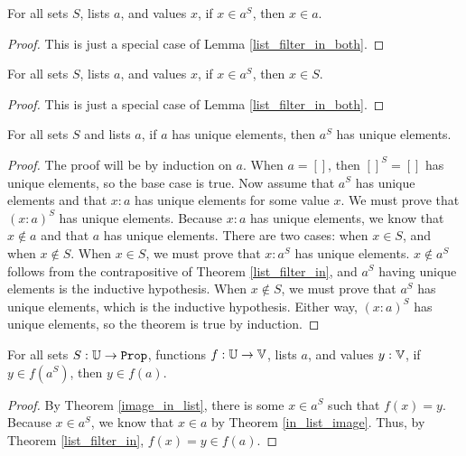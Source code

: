 \documentclass[../math.tex]{subfiles}
\begin{document}
\begin{theorem} \label{list_filter_in}
    For all sets $S$, lists $a$, and values $x$, if $x \in a^S$, then $x \in a$.
\end{theorem}
\begin{proof}
    This is just a special case of Lemma \ref{list_filter_in_both}.
\end{proof}

\begin{theorem} \label{list_filter_in_set}
    For all sets $S$, lists $a$, and values $x$, if $x \in a^S$, then $x \in S$.
\end{theorem}
\begin{proof}
    This is just a special case of Lemma \ref{list_filter_in_both}.
\end{proof}

\begin{theorem} \label{list_filter_unique}
    For all sets $S$ and lists $a$, if $a$ has unique elements, then $a^S$ has
    unique elements.
\end{theorem}
\begin{proof}
    The proof will be by induction on $a$.  When $a = []$, then $[]^S = []$ has
    unique elements, so the base case is true.  Now assume that $a^S$ has unique
    elements and that $x : a$ has unique elements for some value $x$.  We must
    prove that $(x : a)^S$ has unique elements.  Because $x : a$ has unique
    elements, we know that $x \notin a$ and that $a$ has unique elements.  There
    are two cases: when $x \in S$, and when $x \notin S$.  When $x \in S$, we
    must prove that $x : a^S$ has unique elements.  $x \notin a^S$ follows from
    the contrapositive of Theorem \ref{list_filter_in}, and $a^S$ having unique
    elements is the inductive hypothesis.  When $x \notin S$, we must prove that
    $a^S$ has unique elements, which is the inductive hypothesis.  Either way,
    $(x : a)^S$ has unique elements, so the theorem is true by induction.
\end{proof}

\begin{theorem} \label{list_filter_image_in}
    For all sets $S : \set{\U}$, functions $f : \mathbb{U} \to \mathbb{V}$, lists $a$, and
    values $y : \mathbb{V}$, if $y \in f(a^S)$, then $y \in f(a)$.
\end{theorem}
\begin{proof}
    By Theorem \ref{image_in_list}, there is some $x \in a^S$ such that $f(x) =
    y$.  Because $x \in a^S$, we know that $x \in a$ by Theorem
    \ref{in_list_image}.  Thus, by Theorem \ref{list_filter_in}, $f(x) = y \in
    f(a)$.
\end{proof}
\end{document}
